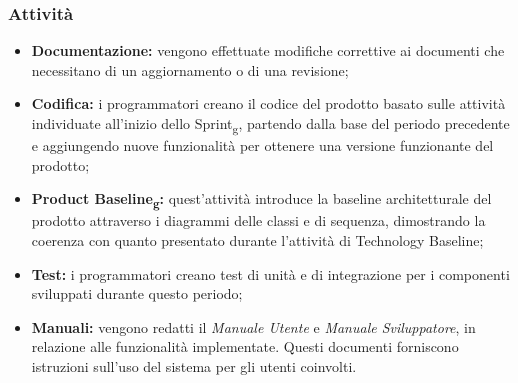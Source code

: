 \subsubsection{Attività}
\begin{itemize}
\item \textbf{Documentazione:} vengono effettuate modifiche correttive ai documenti che necessitano di un aggiornamento o di una revisione;
\item \textbf{Codifica:} i programmatori creano il codice del prodotto basato sulle attività individuate all'inizio dello Sprint\textsubscript{g}, partendo dalla base del periodo precedente e aggiungendo nuove funzionalità per ottenere una versione funzionante del prodotto;
\item \textbf{Product Baseline\textsubscript{g}:} quest'attività introduce la baseline architetturale del prodotto attraverso i diagrammi delle classi e di sequenza, dimostrando la coerenza con quanto presentato durante l'attività di Technology Baseline;  
\item \textbf{Test:} i programmatori creano test di unità e di integrazione per i componenti sviluppati durante questo periodo;
\item \textbf{Manuali:} vengono redatti il \textit{Manuale Utente} e \textit{Manuale Sviluppatore}, in relazione alle funzionalità implementate. Questi documenti forniscono istruzioni sull'uso del sistema per gli utenti coinvolti.
\end{itemize}

